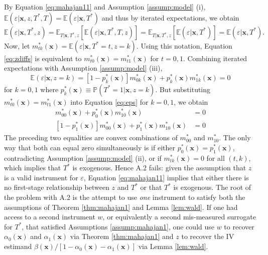 By Equation \ref{eq:mahajan11} and Assumption \ref{assump:model} (i), $\mathbb{E}(\varepsilon|\mathbf{x},z,T^*,T)=\mathbb{E}(\varepsilon|\mathbf{x},T^*)$ and thus by iterated expectations, we obtain
\begin{equation}
  \mathbb{E}(\varepsilon|\mathbf{x},T^*,z) = \mathbb{E}_{T|\mathbf{x},T^*,z}\left[ \mathbb{E}(\varepsilon|\mathbf{x},T^*,T,z) \right] = \mathbb{E}_{T|\mathbf{x},T^*,z}\left[ \mathbb{E}(\varepsilon|\mathbf{x},T^*) \right] = \mathbb{E}(\varepsilon|\mathbf{x}, T^*).
  \label{eq:zdiffs}
\end{equation}
Now, let $m^*_{tk}(\mathbf{x}) = \mathbb{E}(\varepsilon|\mathbf{x}, T^*=t,z=k)$.
Using this notation, Equation \ref{eq:zdiffs} is equivalent to $m^*_{t0}(\mathbf{x}) = m^*_{t1}(\mathbf{x})$ for $t = 0, 1$.
Combining iterated expectations with Assumption \ref{assump:model} (iii), 
\begin{equation}
  \mathbb{E}(\varepsilon|\mathbf{x},z=k) = [1 - p^*_k(\mathbf{x})] m^*_{0k}(\mathbf{x}) + p^*_k(\mathbf{x}) m^*_{1k}(\mathbf{x}) = 0 
  \label{eq:eps}
\end{equation}
for $k = 0,1$ where $p^*_k(\mathbf{x}) \equiv \mathbb{P}(T^*=1|\mathbf{x}, z=k)$.
But substituting $m^*_{t0}(\mathbf{x}) = m^*_{t1}(\mathbf{x})$ into Equation \ref{eq:eps} for $k=0,1$, we obtain 
\begin{align*}
  [1 - p^*_0(\mathbf{x})] m^*_{00}(\mathbf{x}) + p^*_0(\mathbf{x}) m^*_{10}(\mathbf{x}) &= 0\\ 
  [1 - p^*_1(\mathbf{x})] m^*_{00}(\mathbf{x}) + p^*_1(\mathbf{x}) m^*_{10}(\mathbf{x}) &= 0
\end{align*}
The preceding two equalities are convex combinations of $m^*_{00}$ and $m^*_{10}$.
The only way that both can equal zero simultaneously is if either $p^*_0(\mathbf{x}) = p^*_1(\mathbf{x})$, contradicting Assumption \ref{assump:model} (ii), or if $m^*_{tk}(\mathbf{x}) = 0$ for all $(t,k)$, which implies that $T^*$ is exogenous.
Hence \cite{Mahajan} A.2 fails: given the assumption that $z$ is a valid instrument for $\varepsilon$, Equation \ref{eq:mahajan11} implies that either there is no first-stage relationship between $z$ and $T^*$ or that $T^*$ is exogenous.
The root of the problem with A.2 is the attempt to use \emph{one} instrument to satisfy both the assumptions of Theorem \ref{thm:mahajan1} and Lemma \ref{lem:wald}.
If one had access to a second instrument $w$, or equivalently a second mis-measured surrogate for $T^*$, that satisfied Assumptions \ref{assump:mahajan1}, one could use $w$  to recover $\alpha_0(\mathbf{x})$ and $\alpha_1(\mathbf{x})$ via Theorem \ref{thm:mahajan1} and $z$ to recover the IV estimand $\beta(\mathbf{x}) / [1 - \alpha_0(\mathbf{x}) - \alpha_1(\mathbf{x})]$ via Lemma \ref{lem:wald}.

